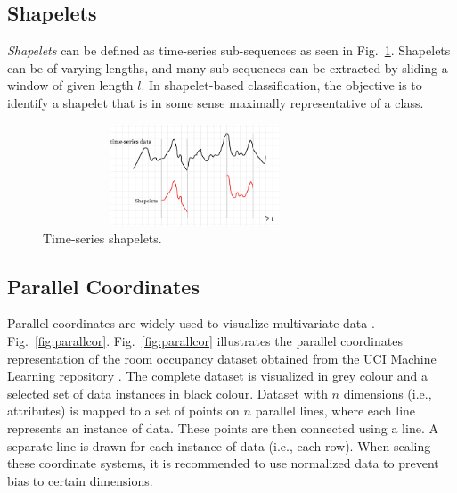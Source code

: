 \documentclass[conference]{IEEEtran}  %
\begin{document}
\subsection{Shapelets}
\textit{Shapelets} can be defined as time-series sub-sequences as seen in Fig.~\ref{fig:shapelets}. 
Shapelets can be of varying lengths, and many sub-sequences can be extracted by sliding a window of given length $l$. In shapelet-based classification, the objective is to identify a shapelet that is in some sense maximally representative of a class.

\begin{figure}
\includegraphics[width=9cm,height=3cm]{shapelet1.png}
\caption{Time-series shapelets.}
\label{fig:shapelets}
\end{figure}

\subsection{Parallel Coordinates}
Parallel coordinates are widely used to visualize multivariate data \cite{IEEEexample:ParallelCoordinates}. Fig.~\ref{fig:parallcor}. Fig.~\ref{fig:parallcor} illustrates the parallel coordinates representation of the room occupancy dataset obtained from the UCI Machine Learning repository \cite{IEEEexample:Ocupancy}. The complete dataset is visualized in grey colour and a selected set of data instances in black colour. Dataset with $n$ dimensions (i.e., attributes) is mapped to a set of points on $n$ parallel lines, where each line represents an instance of data. These points are then connected using a line. A separate line is drawn for each instance of data (i.e., each row). When scaling these coordinate systems, it is recommended to use normalized data to prevent bias to certain dimensions.
\end{document}
